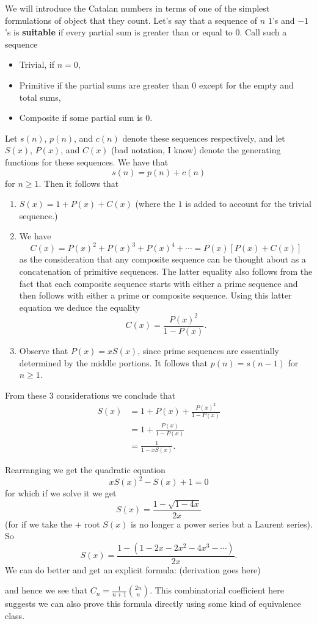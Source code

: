 We will introduce the Catalan numbers in terms of one of the simplest formulations of object that they count. Let's say that a sequence of $n$ $1$'s and $-1$'s is \textbf{suitable} if every partial sum is greater than or equal to $0$. Call such a sequence
\begin{itemize}
	\item Trivial, if $n = 0$,
	\item Primitive if the partial sums are greater than $0$ except for the empty and total sums,
	\item Composite if some partial sum is $0$.
\end{itemize}
Let $s(n)$, $p(n)$, and $c(n)$ denote these sequences respectively, and let $S(x)$, $P(x)$, and $C(x)$ (bad notation, I know) denote the generating functions for these sequences. We have that 
\[s(n) = p(n) + c(n)\] for $n \geq 1$. Then it follows that 
\begin{enumerate}
	\item $S(x) = 1 + P(x) + C(x)$ (where the $1$ is added to account for the trivial sequence.)
	\item We have
	\[C(x) = P(x)^2 + P(x)^3 + P(x)^4 + \cdots = P(x)[P(x) + C(x)]\] as the consideration that any composite sequence can be thought about as a concatenation of primitive sequences. The latter equality also follows from the fact that each composite sequence starts with either a prime sequence and then follows with either a prime or composite sequence. Using this latter equation we deduce the equality
\[C(x) = \frac{P(x)^2}{1 - P(x)}.\]
	\item Observe that $P(x) = xS(x)$, since prime sequences are essentially determined by the middle portions. It follows that $p(n) = s(n-1)$ for $n \geq 1$.
\end{enumerate}

From these 3 considerations we conclude that
\begin{align*}
S(x) &= 1 + P(x) + \frac{P(x)^2}{1 - P(x)} \\
&= 1 + \frac{P(x)}{1-  P(x)} \\
&= \frac{1}{1 - xS(x)}.
\end{align*}

Rearranging we get the quadratic equation 
\[xS(x)^2 - S(x) + 1 = 0\] for which if we solve it we get
\[S(x) = \frac{1 - \sqrt{1 - 4x}}{2x}\] (for if we take the $+$ root $S(x)$ is no longer a power series but a Laurent series). So 
\[S(x) = \frac{1 - (1 - 2x - 2x^2 - 4x^3 - \cdots)}{2x}.\]
We can do better and get an explicit formula: (derivation goes here)

and hence we see that $C_n = \frac{1}{n + 1}\binom{2n}{n}$. This combinatorial coefficient here suggests we can also prove this formula directly using some kind of equivalence class.

